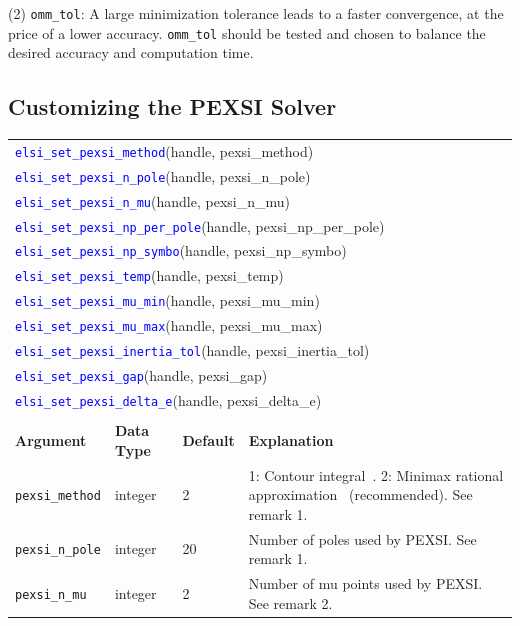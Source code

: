\documentclass{report}
\newcommand{\api}[1]{\textcolor{blue}{\texttt{#1}}}
\begin{document}
(2) \texttt{omm\_tol}: A large minimization tolerance leads to a faster convergence, at the price of a lower accuracy. \texttt{omm\_tol} should be tested and chosen to balance the desired accuracy and computation time.

\subsection{Customizing the PEXSI Solver}
\label{subsec:setter_pexsi}
\begin{tabular}[]{|p{30mm}|p{20mm}|p{15mm}|p{97mm}|}
\multicolumn{4}{l}{\api{elsi\_set\_pexsi\_method}(handle, pexsi\_method)}\\
\multicolumn{4}{l}{\api{elsi\_set\_pexsi\_n\_pole}(handle, pexsi\_n\_pole)}\\
\multicolumn{4}{l}{\api{elsi\_set\_pexsi\_n\_mu}(handle, pexsi\_n\_mu)}\\
\multicolumn{4}{l}{\api{elsi\_set\_pexsi\_np\_per\_pole}(handle, pexsi\_np\_per\_pole)}\\
\multicolumn{4}{l}{\api{elsi\_set\_pexsi\_np\_symbo}(handle, pexsi\_np\_symbo)}\\
\multicolumn{4}{l}{\api{elsi\_set\_pexsi\_temp}(handle, pexsi\_temp)}\\
\multicolumn{4}{l}{\api{elsi\_set\_pexsi\_mu\_min}(handle, pexsi\_mu\_min)}\\
\multicolumn{4}{l}{\api{elsi\_set\_pexsi\_mu\_max}(handle, pexsi\_mu\_max)}\\
\multicolumn{4}{l}{\api{elsi\_set\_pexsi\_inertia\_tol}(handle, pexsi\_inertia\_tol)}\\
\multicolumn{4}{l}{\api{elsi\_set\_pexsi\_gap}(handle, pexsi\_gap)}\\
\multicolumn{4}{l}{\api{elsi\_set\_pexsi\_delta\_e}(handle, pexsi\_delta\_e)}\\
\multicolumn{4}{l}{}\\
\hline
\multicolumn{1}{|l|}{\textbf{Argument}} & \multicolumn{1}{l|}{\textbf{Data Type}} & \multicolumn{1}{l|}{\textbf{Default}} & \multicolumn{1}{l|}{\textbf{Explanation}}\\
\hline
\texttt{pexsi\_method}        & integer     & 2     & 1: Contour integral~\cite{pexsi_lin_2013}. 2: Minimax rational approximation~\cite{pole_moussa_2016} (recommended). See remark 1.\\
\hline
\texttt{pexsi\_n\_pole}       & integer     & 20    & Number of poles used by PEXSI. See remark 1.\\
\hline
\texttt{pexsi\_n\_mu}         & integer     & 2     & Number of mu points used by PEXSI. See remark 2.\\

\end{tabular}
\end{document}
